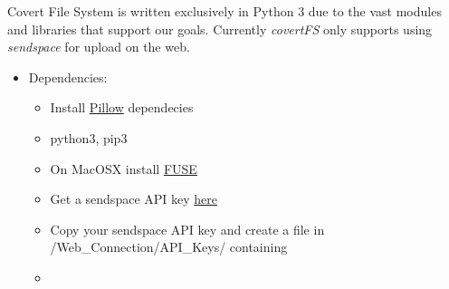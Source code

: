 \documentclass[letterpaper,12pt,openany,oneside]{sphinxmanual}
\begin{document}
Covert File System is written exclusively in Python 3 due to the vast modules and libraries that support our goals. Currently \emph{covertFS} only supports using \emph{sendspace} for upload on the web.
\begin{itemize}
\item {} 
Dependencies:
\begin{itemize}
\item {} 
Install \href{https://pillow.readthedocs.org/en/3.0.0/installation.html}{Pillow} dependecies

\item {} 
python3, pip3 

\item {} 
On MacOSX install \href{https://osxfuse.github.io}{FUSE}

\item {} 
Get a sendspace API key \href{https://www.sendspace.com/dev\_apikeys.html}{here}

\item {} 
Copy your sendspace API key and create a file in /Web\_Connection/API\_Keys/ containing 

\item {} 

\end{itemize}

\end{itemize}
\end{document}
